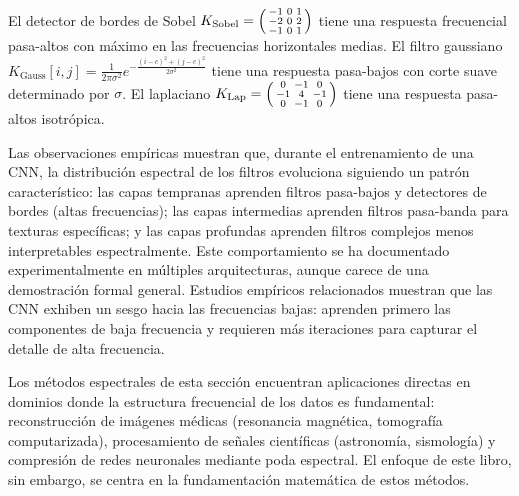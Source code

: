 \begin{example}
\label{ex:grids:common-kernels}
El detector de bordes de Sobel $K_{\text{Sobel}} = \begin{psmallmatrix} -1 & 0 & 1 \\
-2 & 0 & 2 \\ -1 & 0 & 1 \end{psmallmatrix}$ tiene una respuesta frecuencial
pasa-altos con m\'aximo en las frecuencias horizontales medias. El filtro
gaussiano $K_{\text{Gauss}}[i,j] = \frac{1}{2\pi\sigma^2}
e^{-\frac{(i-c)^2 + (j-c)^2}{2\sigma^2}}$ tiene una respuesta pasa-bajos con
corte suave determinado por $\sigma$. El laplaciano
$K_{\text{Lap}} = \begin{psmallmatrix} 0 & -1 & 0 \\ -1 & 4 & -1 \\ 0 & -1 & 0
\end{psmallmatrix}$ tiene una respuesta pasa-altos isotr\'opica.
\end{example}

\begin{remark}
\label{rem:grids:spectral-evolution}
Las observaciones emp\'iricas muestran que, durante el entrenamiento de una CNN,
la distribuci\'on espectral de los filtros evoluciona siguiendo un patr\'on
caracter\'istico: las capas tempranas aprenden filtros pasa-bajos y detectores
de bordes (altas frecuencias); las capas intermedias aprenden filtros pasa-banda
para texturas espec\'ificas; y las capas profundas aprenden filtros complejos
menos interpretables espectralmente. Este comportamiento se ha documentado
experimentalmente en m\'ultiples arquitecturas, aunque carece de una
demostraci\'on formal general. Estudios emp\'iricos relacionados muestran que las
CNN exhiben un sesgo hacia las frecuencias bajas: aprenden primero las
componentes de baja frecuencia y requieren m\'as iteraciones para capturar el
detalle de alta frecuencia.
\end{remark}

Los m\'etodos espectrales de esta secci\'on encuentran aplicaciones directas en
dominios donde la estructura frecuencial de los datos es fundamental:
reconstrucci\'on de im\'agenes m\'edicas (resonancia magn\'etica, tomograf\'ia
computarizada), procesamiento de se\~nales cient\'ificas (astronom\'ia,
sismolog\'ia) y compresi\'on de redes neuronales mediante poda espectral. El
enfoque de este libro, sin embargo, se centra en la fundamentaci\'on
matem\'atica de estos m\'etodos.

